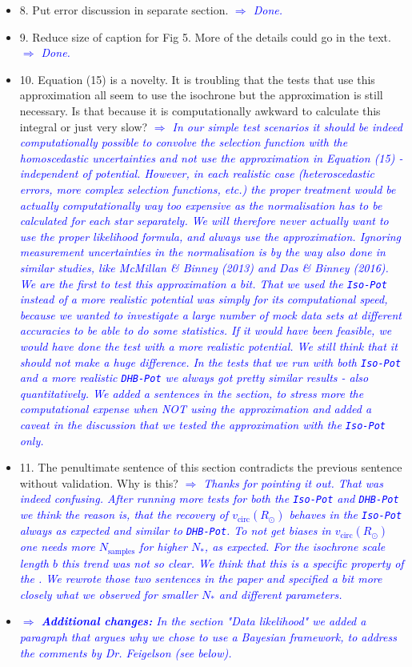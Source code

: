 \documentclass[10pt,a4paper]{article}
\newcommand{\Comment}[1]{\textsl{\textcolor{Blue}{$\Longrightarrow$ {#1}}}}
\begin{document}
\begin{itemize}
\item 8. Put error discussion in separate section. \Comment{Done.}
\item 9. Reduce size of caption for Fig 5. More of the details could go in the text. \Comment{Done.}
\item 10. Equation (15) is a novelty. It is troubling that the tests that use this approximation all seem to use the isochrone but the approximation is still necessary. Is that because it is computationally awkward to calculate this integral or just very slow? \Comment{In our simple test scenarios it should be indeed computationally possible to convolve the selection function with the homoscedastic uncertainties and not use the approximation in Equation (15) - independent of potential. However, in each realistic case (heteroscedastic errors, more complex selection functions, etc.) the proper treatment would be actually computationally way too expensive as the normalisation has to be calculated for each star separately. We will therefore never actually want to use the proper likelihood formula, and always use the approximation. Ignoring measurement uncertainties in the normalisation is by the way also done in similar studies, like McMillan \& Binney (2013) and Das \& Binney (2016). We are the first to test this approximation a bit. That we used the \texttt{Iso-Pot} instead of a more realistic potential was simply for its computational speed, because we wanted to investigate a large number of mock data sets at different accuracies to be able to do some statistics. If it would have been feasible, we would have done the test with a more realistic potential. We still think that it should not make a huge difference. In the tests that we run with both \texttt{Iso-Pot} and a more realistic \texttt{DHB-Pot} we always got pretty similar results - also quantitatively. We added a sentences in the section, to stress more the computational expense when NOT using the approximation and added a caveat in the discussion that we tested the approximation with the \texttt{Iso-Pot} only.}
\item 11. The penultimate sentence of this section contradicts the previous sentence without validation. Why is this? \Comment{Thanks for pointing it out. That was indeed confusing. After running more tests for both the \texttt{Iso-Pot} and \texttt{DHB-Pot} we think the reason is, that the recovery of $v_\text{circ}(R_\odot)$ behaves in the \texttt{Iso-Pot} always as expected and similar to \texttt{DHB-Pot}. To not get biases in $v_\text{circ}(R_\odot)$ one needs more $N_\text{samples}$ for higher $N_*$, as expected. For the isochrone scale length $b$ this trend was not so clear. We think that this is a specific property of the \text{Iso-Pot}. We rewrote those two sentences in the paper and specified a bit more closely what we observed for smaller $N_*$ and different parameters.}
\item \Comment{\textbf{Additional changes:} In the section "Data likelihood" we added a paragraph that argues why we chose to use a Bayesian framework, to address the comments by Dr. Feigelson (see below).}
\end{itemize}
\end{document}
